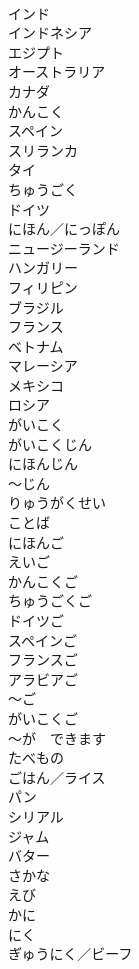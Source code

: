 \documentclass[8pt]{extreport}
\begin{document}
\begin{CJK}{UTF8}{min}
\\	インド	
\\	インドネシア	
\\	エジプト	
\\	オーストラリア	
\\	カナダ	
\\	かんこく	
\\	スペイン	
\\	スリランカ	
\\	タイ	
\\	ちゅうごく	
\\	ドイツ	
\\	にほん／にっぽん	
\\	ニュージーランド	
\\	ハンガリー	
\\	フィリピン	
\\	ブラジル	
\\	フランス	
\\	ベトナム	
\\	マレーシア	
\\	メキシコ	
\\	ロシア	
\\	がいこく	
\\	がいこくじん	
\\	にほんじん	
\\	～じん	
\\	りゅうがくせい	
\\	ことば	
\\	にほんご	
\\	えいご	
\\	かんこくご	
\\	ちゅうごくご	
\\	ドイツご	
\\	スペインご	
\\	フランスご	
\\	アラビアご	
\\	～ご	
\\	がいこくご	
\\	～が　できます	
\\	たべもの	
\\	ごはん／ライス	
\\	パン	
\\	シリアル	
\\	ジャム	
\\	バター	
\\	さかな	
\\	えび	
\\	かに	
\\	にく	
\\	ぎゅうにく／ビーフ	

\end{CJK}
\end{document}
